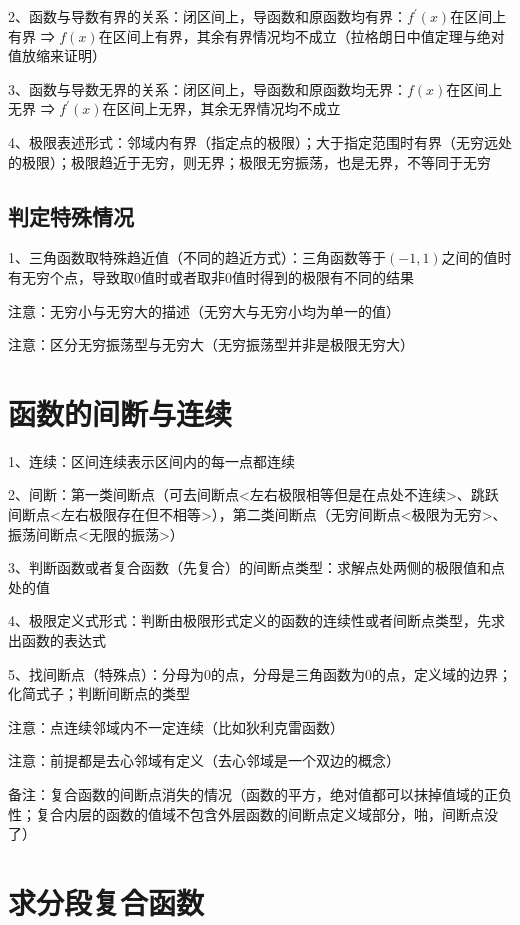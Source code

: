 2、函数与导数有界的关系：闭区间上，导函数和原函数均有界：$ f^{\prime}(x) $在区间上有界 ⇒ $ f(x) $在区间上有界，其余有界情况均不成立（拉格朗日中值定理与绝对值放缩来证明）

3、函数与导数无界的关系：闭区间上，导函数和原函数均无界：$ f(x) $在区间上无界 ⇒ $ f^{\prime}(x) $在区间上无界，其余无界情况均不成立

4、极限表述形式：邻域内有界（指定点的极限）；大于指定范围时有界（无穷远处的极限）；极限趋近于无穷，则无界；极限无穷振荡，也是无界，不等同于无穷



\subsection{判定特殊情况}

1、三角函数取特殊趋近值（不同的趋近方式）：三角函数等于$ (-1,1) $之间的值时有无穷个点，导致取0值时或者取非0值时得到的极限有不同的结果

注意：无穷小与无穷大的描述（无穷大与无穷小均为单一的值）

注意：区分无穷振荡型与无穷大（无穷振荡型并非是极限无穷大）

\section{函数的间断与连续}

1、连续：区间连续表示区间内的每一点都连续

2、间断：第一类间断点（可去间断点<左右极限相等但是在点处不连续>、跳跃间断点<左右极限存在但不相等>），第二类间断点（无穷间断点<极限为无穷>、振荡间断点<无限的振荡>）

3、判断函数或者复合函数（先复合）的间断点类型：求解点处两侧的极限值和点处的值

4、极限定义式形式：判断由极限形式定义的函数的连续性或者间断点类型，先求出函数的表达式

5、找间断点（特殊点）：分母为0的点，分母是三角函数为0的点，定义域的边界；化简式子；判断间断点的类型

注意：点连续邻域内不一定连续（比如狄利克雷函数）

注意：前提都是去心邻域有定义（去心邻域是一个双边的概念）

备注：复合函数的间断点消失的情况（函数的平方，绝对值都可以抹掉值域的正负性；复合内层的函数的值域不包含外层函数的间断点定义域部分，啪，间断点没了）

\section{求分段复合函数}

